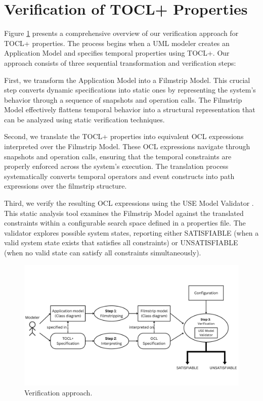 \section{Verification of TOCL+ Properties}

\hspace{1cm} Figure \ref{sec:verification_approach} presents a comprehensive overview 
of our verification approach for TOCL+ properties. The process begins when a UML 
modeler creates an Application Model and specifies temporal properties using TOCL+. 
Our approach consists of three sequential transformation and verification steps:

First, we transform the Application Model into a Filmstrip Model. This crucial step 
converts dynamic specifications into static ones by representing the system's behavior 
through a sequence of snapshots and operation calls. The Filmstrip Model effectively 
flattens temporal behavior into a structural representation that can be analyzed 
using static verification techniques.

Second, we translate the TOCL+ properties into equivalent OCL expressions interpreted 
over the Filmstrip Model. These OCL expressions navigate through snapshots and 
operation calls, ensuring that the temporal constraints are properly enforced across 
the system's execution. The translation process systematically converts temporal 
operators and event constructs into path expressions over the filmstrip structure.

Third, we verify the resulting OCL expressions using the USE Model Validator 
\cite{USE_Validator}. This static analysis tool examines the Filmstrip Model against 
the translated constraints within a configurable search space defined in a properties 
file. The validator explores possible system states, reporting either SATISFIABLE 
(when a valid system state exists that satisfies all constraints) or UNSATISFIABLE 
(when no valid state can satisfy all constraints simultaneously).

\begin{figure}[H]
    \centering
    \includegraphics[width=1\textwidth]{figures/c2/Verification_approach_1.png}
    \caption{Verification approach.}
    \label{sec:verification_approach}
\end{figure}

